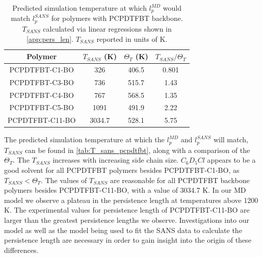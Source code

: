 \begin{table}[ht]
    \centering
    \begin{tabular}{c|c|c|c}
    \textbf{Polymer}   &    \textbf{$T_{SANS}$} (K) &$\Theta_T$ (K) & $\textbf{$T_{SANS}$}/\Theta_T$ \\
    \hline
    PCPDTFBT-C1-BO     &    326 &406.5    &      0.801   \\
    PCPDTFBT-C3-BO     &    736 &515.7    &      1.43   \\
    PCPDTFBT-C4-BO     &    767 &568.5    &      1.35    \\
    PCPDTFBT-C5-BO     &    1091 &491.9   &      2.22    \\
    PCPDTFBT-C11-BO    &    3034.7 &528.1 &      5.75       \\
    \end{tabular}
    \caption{Predicted simulation temperature at which $l_p^{MD}$ would match $l_p^{SANS}$ for polymers with PCPDTFBT backbone. $T_{SANS}$ calculated via linear regressions shown in \autoref{app:pers_len}. $T_{SANS}$ reported in units of K.}
    \label{tab:T_sans_pcpdtfbt}
\end{table}
\par The predicted simulation temperature at which the $l_p^{MD}$ and $l_p^{SANS}$ will match, $T_{SANS}$ can be found in \autoref{tab:T_sans_pcpdtfbt}, along with a comparison of the $\Theta_T$. The $T_{SANS}$ increases with increasing side chain size. $C_{6}D_{5}Cl$ appears to be a good solvent for all PCPDTFBT polymers besides PCPDTFBT-C1-BO, as $T_{SANS} < \Theta_T$. The values of $T_{SANS}$ are reasonable for all PCPDTFBT backbone polymers besides PCPDTFBT-C11-BO, with a value of 3034.7 K. In our MD model we observe a plateau in the persistence length at temperatures above 1200 K. The experimental values for persistence length of PCPDTFBT-C11-BO are larger than the greatest persistence lengths we observe. Investigations into our model as well as the model being used to fit the SANS data to calculate the persistence length are necessary in order to gain insight into the origin of these differences. 
